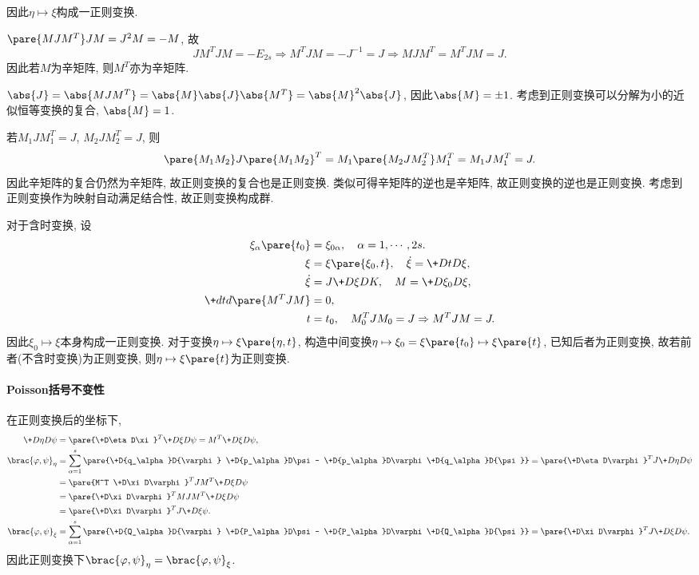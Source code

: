 \documentclass{ctexart}
\begin{document}
因此$\eta\mapsto \xi$构成一正则变换.
\begin{theorem}[辛矩阵的性质]
    \mbox{}
    \begin{cenum}
        \item $\pare{MJM^T}JM = J^2M = -M$, 故
        \[ JM^TJM = -E_{2s} \Rightarrow M^TJM = -J^{-1} = J \Rightarrow MJM^T = M^TJM = J. \]
        因此若$M$为辛矩阵, 则$M^T$亦为辛矩阵.
        \item $\abs{J} = \abs{MJM^T} = \abs{M}\abs{J}\abs{M^T} = \abs{M}^2\abs{J}$, 因此$\abs{M} = \pm 1$. 考虑到正则变换可以分解为小的近似恒等变换的复合, $\abs{M} = 1$.
        \item 若$M_1JM_1^T = J$, $M_2JM_2^T = J$, 则
        \[ \pare{M_1M_2}J\pare{M_1M_2}^T = M_1\pare{M_2JM_2^T}M_1^T = M_1JM_1^T = J. \]
        因此辛矩阵的复合仍然为辛矩阵, 故正则变换的复合也是正则变换. 类似可得辛矩阵的逆也是辛矩阵, 故正则变换的逆也是正则变换. 考虑到正则变换作为映射自动满足结合性, 故正则变换构成群.
    \end{cenum}
\end{theorem}
对于含时变换, 设
\begin{align*}
    \xi_\alpha\pare{t_0} &= \xi_{0\alpha},\quad \alpha = 1,\cdots, 2s. \\
    \xi &= \xi\pare{\xi_0,t},\quad \dot{\xi} = \+DtD\xi, \\
    \dot{\xi} &= J\+D\xi DK,\quad M = \+D{\xi_0}D\xi, \\
    \+dtd{}\pare{M^T JM} &= 0, \\
    t&= t_0,\quad M_0^TJM_0 = J \Rightarrow M^T JM = J.
\end{align*}
因此$\xi_0\mapsto \xi$本身构成一正则变换. 对于变换$\eta\mapsto \xi\pare{\eta,t}$, 构造中间变换$\eta\mapsto \xi_0 = \xi\pare{t_0} \mapsto \xi\pare{t}$, 已知后者为正则变换, 故若前者(不含时变换)为正则变换, 则$\eta\mapsto \xi\pare{t}$为正则变换.


\paragraph{Poisson括号不变性} %
\label{par:poisson括号不变性}

在正则变换后的坐标下,
\begin{align*}
    \+D\eta D\psi &= \pare{\+D\eta D\xi}^T \+D\xi D\psi = M^T \+D\xi D\psi, \\
    \brac{\varphi,\psi}_\eta &= \sum_{\alpha = 1}^s \pare{\+D{q_\alpha}D{\varphi} \+D{p_\alpha}D\psi - \+D{p_\alpha}D\varphi \+D{q_\alpha}D{\psi}} = \pare{\+D\eta D\varphi}^T J \+D\eta D\psi \\
    &= \pare{M^T \+D\xi D\varphi}^T JM^T\+D\xi D\psi \\
    &= \pare{\+D\xi D\varphi}^T MJM^T \+D\xi D\psi \\
    &= \pare{\+D\xi D\varphi}^T J \+D{\xi \psi}. \\
    \brac{\varphi,\psi}_\xi &= \sum_{\alpha = 1}^s \pare{\+D{Q_\alpha}D{\varphi} \+D{P_\alpha}D\psi - \+D{P_\alpha}D\varphi \+D{Q_\alpha}D{\psi}} = \pare{\+D\xi D\varphi}^T J \+D\xi D\psi.
\end{align*}
因此正则变换下$\brac{\varphi,\psi}_\eta = \brac{\varphi,\psi}_\xi$.
\end{document}
